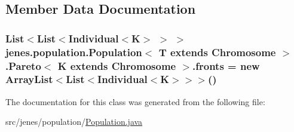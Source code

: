 \subsection{Member Data Documentation}
\hypertarget{classjenes_1_1population_1_1_population_3_01_t_01extends_01_chromosome_01_4_1_1_pareto_3_01_k_01extends_01_chromosome_01_4_acf401dc9cc74ecbdf610d67bd9131aa2}{
\subsubsection[{fronts}]{\setlength{\rightskip}{0pt plus 5cm}List$<$List$<$Individual$<$K$>$ $>$ $>$ jenes.\-population.\-Population$<$ T extends Chromosome $>$.{\bf Pareto}$<$ K extends Chromosome $>$.fronts = new Array\-List$<$List$<$Individual$<$K$>$$>$$>$()\hspace{0.3cm}{\ttfamily [private]}}}\label{classjenes_1_1population_1_1_population_3_01_t_01extends_01_chromosome_01_4_1_1_pareto_3_01_k_01extends_01_chromosome_01_4_acf401dc9cc74ecbdf610d67bd9131aa2}


The documentation for this class was generated from the following file\-:\begin{DoxyCompactItemize}
\item 
src/jenes/population/\hyperlink{_population_8java}{Population.\-java}\end{DoxyCompactItemize}
